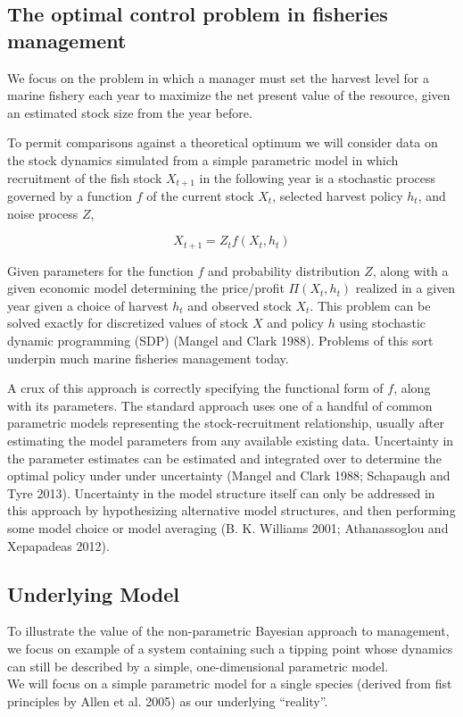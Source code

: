 \documentclass[author-year, review]{elsarticle} %
\begin{document}
\subsection{The optimal control problem in fisheries
management}\label{the-optimal-control-problem-in-fisheries-management}

We focus on the problem in which a manager must set the harvest level
for a marine fishery each year to maximize the net present value of the
resource, given an estimated stock size from the year before.

To permit comparisons against a theoretical optimum we will consider
data on the stock dynamics simulated from a simple parametric model in
which recruitment of the fish stock $X_{t+1}$ in the following year is a
stochastic process governed by a function $f$ of the current stock
$X_t$, selected harvest policy $h_t$, and noise process $Z$,

\[X_{t+1} = Z_t f(X_t, h_t) \]

Given parameters for the function $f$ and probability distribution $Z$,
along with a given economic model determining the price/profit
$\Pi(X_t, h_t)$ realized in a given year given a choice of harvest $h_t$
and observed stock $X_t$. This problem can be solved exactly for
discretized values of stock $X$ and policy $h$ using stochastic dynamic
programming (SDP) (Mangel and Clark 1988). Problems of this sort
underpin much marine fisheries management today.

A crux of this approach is correctly specifying the functional form of
$f$, along with its parameters. The standard approach uses one of a
handful of common parametric models representing the stock-recruitment
relationship, usually after estimating the model parameters from any
available existing data. Uncertainty in the parameter estimates can be
estimated and integrated over to determine the optimal policy under
under uncertainty (Mangel and Clark 1988; Schapaugh and Tyre 2013).
Uncertainty in the model structure itself can only be addressed in this
approach by hypothesizing alternative model structures, and then
performing some model choice or model averaging (B. K. Williams 2001;
Athanassoglou and Xepapadeas 2012).

\subsection{Underlying Model}\label{underlying-model}

To illustrate the value of the non-parametric Bayesian approach to
management, we focus on example of a system containing such a tipping
point whose dynamics can still be described by a simple, one-dimensional
parametric model.\\We will focus on a simple parametric model for a
single species (derived from fist principles by Allen et al. 2005) as
our underlying ``reality''.
\end{document}
